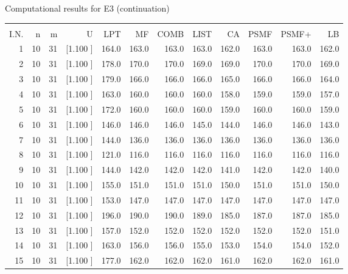 \documentclass[12pt,a4paper]{article}
\begin{document}
\newpage
\begin{center}
 Computational results for E3 (continuation) {\tiny
\begin{tabular}{r r r r r r r r r r r r}\hline
    &   &   &          &        &        &        &        &        &        &        &       \\[-0.1in]
  I.N.  &  n  &  m  &  U  &  LPT  &  MF  &  COMB  &  LIST  &  CA  & PSMF &PSMF+ & LB \\[0.03in]
\hline
   1& 10& 31&[1.100     ]&   164.0&   163.0&   163.0&   163.0&   162.0&   163.0&   163.0&   162.0\\[-0.02in]
   2& 10& 31&[1.100     ]&   178.0&   170.0&   170.0&   169.0&   169.0&   170.0&   170.0&   169.0\\[-0.02in]
   3& 10& 31&[1.100     ]&   179.0&   166.0&   166.0&   166.0&   165.0&   166.0&   166.0&   164.0\\[-0.02in]
   4& 10& 31&[1.100     ]&   163.0&   160.0&   160.0&   160.0&   158.0&   159.0&   159.0&   157.0\\[-0.02in]
   5& 10& 31&[1.100     ]&   172.0&   160.0&   160.0&   160.0&   159.0&   160.0&   160.0&   159.0\\[-0.02in]
   6& 10& 31&[1.100     ]&   146.0&   146.0&   146.0&   145.0&   144.0&   146.0&   146.0&   143.0\\[-0.02in]
   7& 10& 31&[1.100     ]&   144.0&   136.0&   136.0&   136.0&   136.0&   136.0&   136.0&   136.0\\[-0.02in]
   8& 10& 31&[1.100     ]&   121.0&   116.0&   116.0&   116.0&   116.0&   116.0&   116.0&   116.0\\[-0.02in]
   9& 10& 31&[1.100     ]&   144.0&   142.0&   142.0&   142.0&   141.0&   142.0&   142.0&   140.0\\[-0.02in]
  10& 10& 31&[1.100     ]&   155.0&   151.0&   151.0&   151.0&   150.0&   151.0&   151.0&   150.0\\[-0.02in]
  11& 10& 31&[1.100     ]&   153.0&   147.0&   147.0&   147.0&   147.0&   147.0&   147.0&   147.0\\[-0.02in]
  12& 10& 31&[1.100     ]&   196.0&   190.0&   190.0&   189.0&   185.0&   187.0&   187.0&   185.0\\[-0.02in]
  13& 10& 31&[1.100     ]&   157.0&   152.0&   152.0&   152.0&   152.0&   152.0&   152.0&   151.0\\[-0.02in]
  14& 10& 31&[1.100     ]&   163.0&   156.0&   156.0&   155.0&   153.0&   154.0&   154.0&   152.0\\[-0.02in]
  15& 10& 31&[1.100     ]&   177.0&   162.0&   162.0&   162.0&   161.0&   162.0&   162.0&   161.0\\[-0.02in]

\end{tabular}}
\end{center}
\end{document}

